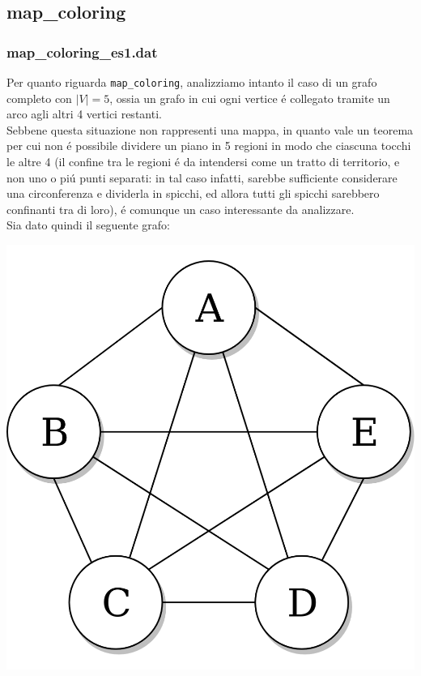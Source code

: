 \documentclass{article}
\begin{document}
\subsection{map\_coloring}
\subsubsection{map\_coloring\_es1.dat}

Per quanto riguarda \texttt{map\_coloring}, analizziamo intanto il caso di un grafo completo con $|V| = 5$, ossia un grafo in cui ogni vertice \'e collegato tramite un arco agli altri 4 vertici restanti. \\
Sebbene questa situazione non rappresenti una mappa, in quanto vale un teorema per cui non \'e possibile dividere un piano in 5 regioni in modo che ciascuna tocchi le altre 4 (il confine tra le regioni \'e da intendersi come un tratto di territorio, e non uno o pi\'u punti separati: in tal caso infatti, sarebbe sufficiente considerare una circonferenza e dividerla in spicchi, ed allora tutti gli spicchi sarebbero confinanti tra di loro), \'e comunque un caso interessante da analizzare.\\

Sia dato quindi il seguente grafo:\\

\begin{center}
\includegraphics[scale=0.15]{complete_graph.png}
\end{center}
\end{document}
